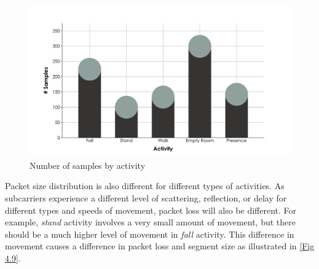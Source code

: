 \begin{figure}[H]
\centering
\includegraphics[width=1.0\textwidth]{./figure/chap 4/labelwise_data_counts.png}
\caption{Number of samples by activity}
\label{Fig 4.8}
\end{figure}

Packet size distribution is also different for different types of activities. As subcarriers experience a different level of scattering, reflection, or delay for different types and speeds of movement, packet loss will also be different. For example, \emph{stand} activity involves a very small amount of movement, but there should be a much higher level of movement in \emph{fall} activity. This difference in movement causes a difference in packet loss and segment size as illustrated in \ref{Fig 4.9}.

